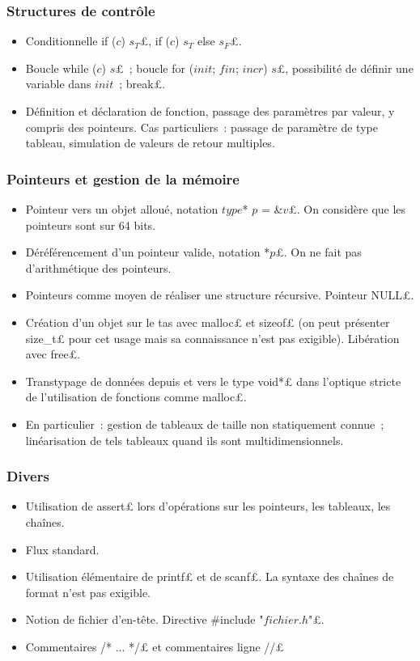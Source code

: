 \subsubsection*{Structures de contrôle}
\begin{itemize}
\item Conditionnelle \£if ($c$) $s_T$£, \£if ($c$) $s_T$ else $s_F$£.
\item Boucle \£while ($c$) $s$£~; boucle \£for ($\mathit{init}$; $\mathit{fin}$; $\mathit{incr}$) $s$£, possibilité de définir une variable dans $\mathit{init}$~; \£break£.
\item Définition et déclaration de fonction, passage des paramètres par valeur, y compris des pointeurs. Cas particuliers~: passage de paramètre de type tableau, simulation de valeurs de retour multiples.
\end{itemize}

\subsubsection*{Pointeurs et gestion de la mémoire}
\begin{itemize}
\item Pointeur vers un objet alloué, notation \£$\mathit{type}$* $p$ = &$v$£. On considère que les pointeurs sont sur 64 bits.
\item Déréférencement d'un pointeur valide, notation \£*$p$£. On ne fait pas d'arithmétique des pointeurs.
\item Pointeurs comme moyen de réaliser une structure récursive. Pointeur \£NULL£.
\item Création d'un objet sur le tas avec \£malloc£ et \£sizeof£ (on peut présenter \£size_t£ pour cet usage mais sa connaissance n'est pas exigible). Libération avec \£free£.
\item Transtypage de données depuis et vers le type \£void*£ dans l'optique stricte de l'utilisation de fonctions comme \£malloc£.
\item En particulier~: gestion de tableaux de taille non statiquement connue~; linéarisation de tels tableaux quand ils sont multidimensionnels.
\end{itemize}

\subsubsection*{Divers}
\begin{itemize}
\item Utilisation de \£assert£ lors d'opérations sur les pointeurs, les tableaux, les chaînes.
\item Flux standard.
\item Utilisation élémentaire de \£printf£ et de \£scanf£. La syntaxe des chaînes de format n'est pas exigible.
\item Notion de fichier d'en-tête. Directive \£#include "$\mathit{fichier.h}$"£.
\item Commentaires \£/* ... */£ et commentaires ligne \£//£
\end{itemize}

